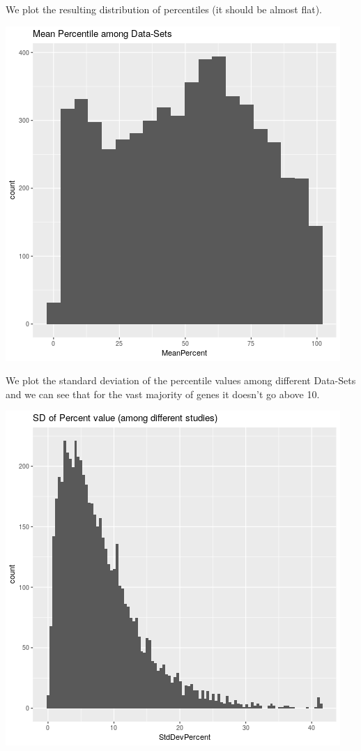 \documentclass[11pt]{article}
\begin{document}
We plot the resulting distribution of percentiles (it should be almost flat).
\begin{center}
\includegraphics[width=.9\linewidth]{./Plots/rnaseq_perc.png}
\end{center}


We plot the standard deviation of the percentile values among different Data-Sets and we can see that for the vast majority of genes it doesn't go above 10.
\begin{center}
\includegraphics[width=.9\linewidth]{./Plots/rnaseq_perc_sd.png}
\end{center}
\end{document}
